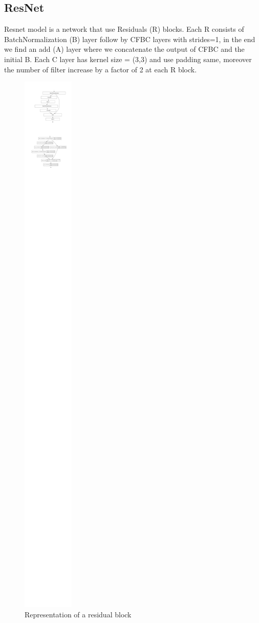 \documentclass[10pt,twocolumn,letterpaper]{article}
\begin{document}
\subsection*{ResNet}
Resnet model is a network that use Residuals (R) blocks. Each R consists of BatchNormalization (B) layer follow by CFBC layers with strides=1, in the end we find an add (A) layer where we concatenate the output of CFBC and the initial B. Each C layer has kernel size = (3,3) and use padding same, moreover the number of filter increase by a factor of 2 at each R block.
\begin{figure}[H]
   \centering
   \includegraphics[width=0.7\linewidth]{./immagini/residual_block.pdf}
   \caption{Representation of a residual block}
\end{figure}
\end{document}
